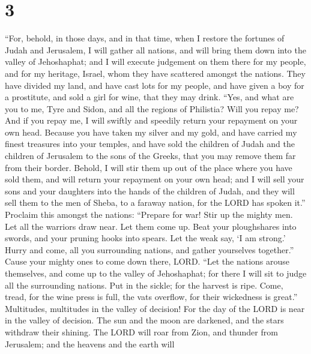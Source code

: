 \hypertarget{section-2}{%
\section{3}\label{section-2}}

 ``For, behold, in those days, and in that time, when I
restore the fortunes of Judah and Jerusalem,  I will
gather all nations, and will bring them down into the valley of
Jehoshaphat; and I will execute judgement on them there for my people,
and for my heritage, Israel, whom they have scattered amongst the
nations. They have divided my land,  and have cast lots
for my people, and have given a boy for a prostitute, and sold a girl
for wine, that they may drink.  ``Yes, and what are you to
me, Tyre and Sidon, and all the regions of Philistia? Will you repay me?
And if you repay me, I will swiftly and speedily return your repayment
on your own head.  Because you have taken my silver and my
gold, and have carried my finest treasures into your temples,
 and have sold the children of Judah and the children of
Jerusalem to the sons of the Greeks, that you may remove them far from
their border.  Behold, I will stir them up out of the
place where you have sold them, and will return your repayment on your
own head;  and I will sell your sons and your daughters
into the hands of the children of Judah, and they will sell them to the
men of Sheba, to a faraway nation, for the LORD has spoken it.''
 Proclaim this amongst the nations: ``Prepare for war!
Stir up the mighty men. Let all the warriors draw near. Let them come
up.  Beat your ploughshares into swords, and your pruning
hooks into spears. Let the weak say, `I am strong.' 
Hurry and come, all you surrounding nations, and gather yourselves
together.'' Cause your mighty ones to come down there, LORD.
 ``Let the nations arouse themselves, and come up to the
valley of Jehoshaphat; for there I will sit to judge all the surrounding
nations.  Put in the sickle; for the harvest is ripe.
Come, tread, for the wine press is full, the vats overflow, for their
wickedness is great.''  Multitudes, multitudes in the
valley of decision! For the day of the LORD is near in the valley of
decision.  The sun and the moon are darkened, and the
stars withdraw their shining.  The LORD will roar from
Zion, and thunder from Jerusalem; and the heavens and the earth will
